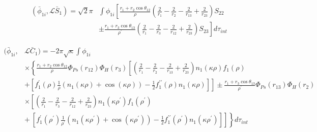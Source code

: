 \documentclass[Dissertation.tex]{subfiles}
\begin{document}



\begin{align}
\label{eq:PWavePhi1SBar}
\nonumber \left(\bar{\phi}_{1i},\mathcal{L} \bar{S}_1\right) = \sqrt{2} \pi & \int \phi_{1i} \left[ \frac{r_1 + r_2 \cos\theta_{12}}{\rho} \left( \frac{2}{r_1} - \frac{2}{r_2} - \frac{2}{r_{13}} + \frac{2}{r_{23}} \right) S_{22} \right. \\
& \pm \left. \frac{r_1 + r_3 \cos\theta_{13}}{\rho^\prime} \left( \frac{2}{r_1} - \frac{2}{r_3} - \frac{2}{r_{12}} + \frac{2}{r_{23}} \right) S_{23} \right]  d\tau_{int}
\end{align}

\begin{align}
\label{eq:PWavePhi1CBar}
\nonumber (\bar{\phi}_{1i},&\mathcal{L} \bar{C}_1) = -2 \pi \sqrt{\kappa} \int \phi_{1i} \\
\nonumber & \times \left\{ \frac{r_1 + r_2 \cos\theta_{12}}{\rho} \Phi_{Ps}(r_{12}) \Phi_H(r_3) \left[ \left( \frac{2}{r_1} - \frac{2}{r_2} - \frac{2}{r_{13}} + \frac{2}{r_{23}} \right) n_1(\kappa\rho) f_1(\rho) \right. \right. \\
\nonumber & + \left.\left. \left[f_1^\prime(\rho) \frac{1}{\rho} \left( n_1(\kappa\rho) + \cos(\kappa\rho) \right) - \frac{1}{2} f_1^{\prime\prime}(\rho) n_1(\kappa\rho) \right]\right] \pm \frac{r_1 + r_3 \cos\theta_{13}}{\rho^\prime}  \Phi_{Ps}(r_{13}) \Phi_H(r_2) \right. \\
\nonumber & \times \left[ \left( \frac{2}{r_1} - \frac{2}{r_3} - \frac{2}{r_{12}} + \frac{2}{r_{23}} \right) n_1(\kappa\rho^\prime) f_1(\rho^\prime) \right. \\ 
& \left.\left. + \ \left[f_1^\prime(\rho^\prime) \frac{1}{\rho^\prime} \left( n_1(\kappa\rho^\prime) + \cos(\kappa\rho^\prime) \right) - \frac{1}{2} f_1^{\prime\prime}(\rho^\prime) n_1(\kappa\rho^\prime) \right]\right]\right\} d\tau_{int}
\end{align}
\end{document}
